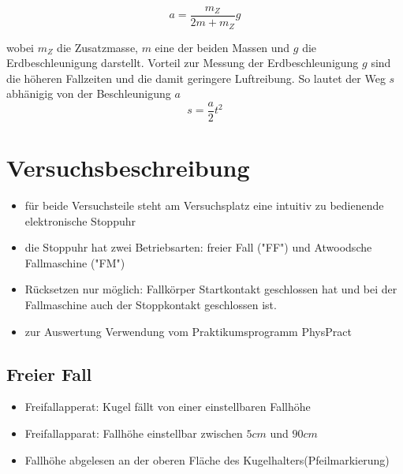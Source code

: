 \documentclass{protokoll}
\begin{document}
\begin{equation}
 a = \frac{m_Z}{2m + m_Z} g 
\end{equation}



wobei $m_Z$ die Zusatzmasse, $ m $ eine der beiden Massen und 
$g$ die Erdbeschleunigung darstellt. 
Vorteil zur Messung der Erdbeschleunigung $g$ sind die höheren
Fallzeiten und die damit geringere Luftreibung.
So lautet der Weg $s$ abhänigig von der Beschleunigung $a$
\begin{equation}
 s = \frac{a}{2} t^2 
\end{equation}






\section{Versuchsbeschreibung}
\begin{itemize}

\item für beide Versuchsteile steht am Versuchsplatz eine 
intuitiv zu bedienende elektronische Stoppuhr
\item die Stoppuhr hat zwei Betriebsarten: freier Fall ("FF") 
und Atwoodsche Fallmaschine ("FM")
\item Rücksetzen nur möglich: Fallkörper Startkontakt geschlossen 
hat und bei der Fallmaschine auch der Stoppkontakt geschlossen ist.
\item zur Auswertung Verwendung vom Praktikumsprogramm PhysPract

\end{itemize}


\subsection{Freier Fall}
\begin{itemize}

\item Freifallapperat: Kugel fällt von einer einstellbaren Fallhöhe
\item Freifallapparat: Fallhöhe einstellbar zwischen $5cm$  und $90cm$
\item Fallhöhe abgelesen an der oberen Fläche des Kugelhalters(Pfeilmarkierung)

\end{itemize}
\end{document}
